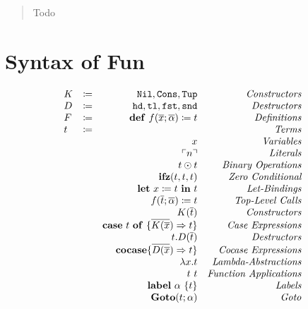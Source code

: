 \documentclass[nonacm]{acmart}
\newcommand{\lit}[1]{\ensuremath{\ulcorner #1\urcorner}}
\newcommand{\letin}[3]{\ensuremath{\mathbf{let}\ #1 \coloneq #2\ \mathbf{in}\ #3}}
\newcommand{\caseof}[2]{\ensuremath{\mathbf{case}\ #1\ \mathbf{of}\ \{ #2 \}}}
\begin{document}
\author{Jonathan Immanuel Brachthäuser}

\author{Klaus Ostermann}

\begin{abstract}
  Todo
\end{abstract}

\maketitle


\section{Syntax of Fun}

\[ 
\begin{array}{l c r r} 
  K & \coloneqq & \mathtt{Nil}, \mathtt{Cons}, \mathtt{Tup} & \emph{Constructors}\\
  D & \coloneqq & \mathtt{hd}, \mathtt{tl}, \mathtt{fst}, \mathtt{snd} & \emph{Destructors}\\
  F & \coloneqq & \mathbf{def}\ f(\overline{x};\overline{\alpha}) \coloneq t & \emph{Definitions}\\
  t & \coloneqq & & \emph{Terms}\\
  && x & \emph{Variables}\\
  && \lit{n}  & \emph{Literals}\\
  && t \odot t & \emph{Binary Operations}\\
  && \mathbf{ifz}(t,t,t) & \emph{Zero Conditional}\\
  && \letin{x}{t}{t} & \emph{Let-Bindings}\\
  && f(\overline{t};\overline{\alpha}) \coloneq t & \emph{Top-Level Calls}\\
  && K(\overline{t}) & \emph{Constructors}\\
  && \caseof{t}{\overline{K(\overline{x}}) \Rightarrow t} & \emph{Case Expressions}\\
  && t.D(\overline{t}) & \emph{Destructors}\\
  && \mathbf{cocase} \{ \overline{ D(\overline{x}}) \Rightarrow t \} & \emph{Cocase Expressions}\\
  && \lambda x.t & \emph{Lambda-Abstractions}\\
  && t\ t & \emph{Function Applications}\\
  && \mathbf{label}\ \alpha\ \{t\} & \emph{Labels}\\
  && \mathbf{Goto}(t;\alpha) & \emph{Goto}
\end{array}
\]
\end{document}
